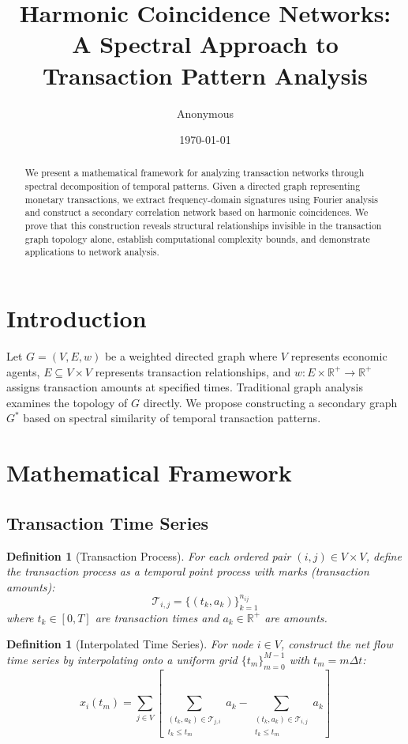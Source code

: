 \documentclass[12pt]{article}
\title{Harmonic Coincidence Networks: \\
A Spectral Approach to Transaction Pattern Analysis}
\author{Anonymous}
\date{\today}
\newtheorem{definition}[theorem]{Definition}
\begin{document}
\maketitle

\begin{abstract}
We present a mathematical framework for analyzing transaction networks through spectral decomposition of temporal patterns. Given a directed graph representing monetary transactions, we extract frequency-domain signatures using Fourier analysis and construct a secondary correlation network based on harmonic coincidences. We prove that this construction reveals structural relationships invisible in the transaction graph topology alone, establish computational complexity bounds, and demonstrate applications to network analysis.
\end{abstract}

\section{Introduction}

Let $G = (V, E, w)$ be a weighted directed graph where $V$ represents economic agents, $E \subseteq V \times V$ represents transaction relationships, and $w: E \times \mathbb{R}^+ \to \mathbb{R}^+$ assigns transaction amounts at specified times. Traditional graph analysis examines the topology of $G$ directly. We propose constructing a secondary graph $G^*$ based on spectral similarity of temporal transaction patterns.

\section{Mathematical Framework}

\subsection{Transaction Time Series}

\begin{definition}[Transaction Process]
For each ordered pair $(i,j) \in V \times V$, define the transaction process as a temporal point process with marks (transaction amounts):
$$
\mathcal{T}_{i,j} = \{(t_k, a_k)\}_{k=1}^{n_{ij}}
$$
where $t_k \in [0,T]$ are transaction times and $a_k \in \mathbb{R}^+$ are amounts.
\end{definition}

\begin{definition}[Interpolated Time Series]
For node $i \in V$, construct the net flow time series by interpolating onto a uniform grid $\{t_m\}_{m=0}^{M-1}$ with $t_m = m\Delta t$:
$$
x_i(t_m) = \sum_{j \in V} \left[ \sum_{\substack{(t_k, a_k) \in \mathcal{T}_{j,i} \\ t_k \leq t_m}} a_k - \sum_{\substack{(t_k, a_k) \in \mathcal{T}_{i,j} \\ t_k \leq t_m}} a_k \right]
$$
\end{definition}
\end{document}
